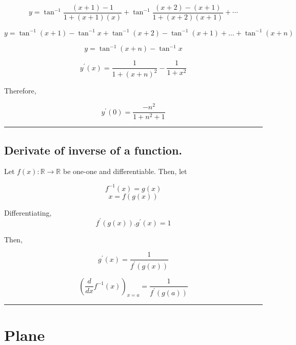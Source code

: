 \documentclass[twocolumn]{article}
\begin{document}
\begin{CJK*}{UTF8}{gbsn}
\[
    y = \tan ^{-1} \frac{(x+1)-1}{1 + (x+1)(x)} + \tan ^{-1} \frac{(x+2)-(x+1)}{1 + (x+2)(x+1)} + \cdots 
\]

\[
    y = \tan ^{-1} (x+1) - \tan ^{-1} x + \tan ^{-1} (x+2) - \tan ^{-1}(x+1) + \dots + \tan^{-1} (x+n) 
\]

\[
    y = \tan^{-1} (x+n) - \tan ^{-1} x
\]

\[
    y^{\prime} (x) = \frac{1}{1 + (x+n)^{2}} - \frac{1}{1+x^{2} }
\]

Therefore, 

\[
    \boxed{y^{\prime} (0) = \frac{-n^{2}}{1 + n^{2} + 1}}
\]

\hrule

\subsection*{Derivate of inverse of a function.}

Let \(f(x) : \mathbb{R} \to \mathbb{R}\) be one-one and differentiable. Then, let 

\[
    f^{-1} (x) = g(x)
\]
\[
    x = f(g(x))
\]

Differentiating,
\[
    f^{\prime} (g(x)). g^{\prime} (x) = 1 
\]

Then, 

\[
    g^{\prime} (x) = \frac{1}{f^{\prime} (g(x))}
\]

\[
    \boxed{(\frac{d}{dx}f^{-1} (x))_{x=a} = \frac{1}{f^{\prime} (g(a))}}
\]

\hrule 

\section*{Plane}

\begin{center}
\end{center}
\end{CJK*}
\end{document}
